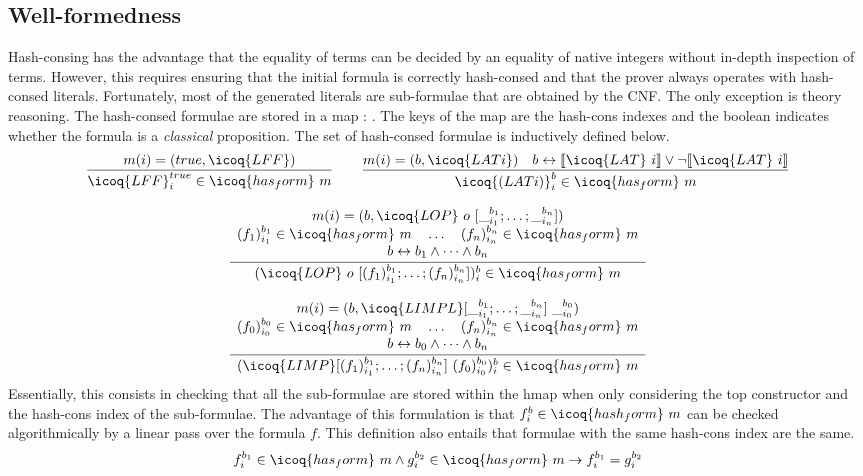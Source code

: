 \documentclass[utf8,a4paper,UKenglish,cleveref, autoref, thm-restate]{lipics-v2021}
\begin{document}
\subsection{Well-formedness}

Hash-consing has the advantage that the equality of terms can be
decided by an equality of native integers without in-depth inspection
of terms. However, this requires ensuring that the initial formula is
correctly hash-consed and that the prover always operates with
hash-consed literals. Fortunately, most of the generated literals are
sub-formulae that are obtained by the CNF. The only exception is
theory reasoning.
%
The hash-consed formulae are stored in a map  :
.  The keys of the map are the hash-cons indexes
and the boolean indicates whether the formula is a \emph{classical}
proposition. The set of hash-consed formulae  is
inductively defined below.
\[
  \begin{array}{c}
  \dfrac{m(i) = (true,\icoq{LFF})}
  {\icoq{LFF}_i^{true} \in \icoq{has_form}\ m }
  \qquad
  \dfrac{m(i) = (b,\icoq{LAT i}) \quad b \leftrightarrow \llbracket \icoq{LAT}\ i \rrbracket \lor \neg \llbracket \icoq{LAT}\ i \rrbracket }
  {\icoq{(LAT i)}_i^b \in \icoq{has_form}\ m }\\
    \\
    \dfrac{
    \begin{array}{c}
      m(i) = (b,\icoq{LOP}\ o\ [\__{i_1}^{b_1} ; \dots ; \__{i_n}^{b_n}]) \\
      (f_1)_{i_1}^{b_1} \in \icoq{has_form}\ m \quad \dots \quad (f_n)_{i_n}^{b_n} \in  \icoq{has_form}\ m\\
      b \leftrightarrow b_1 \land \dots \land b_n
    \end{array}}
    {(\icoq{LOP}\ o\  [(f_1)_{i_1}^{b_1}; \dots ; (f_n)_{i_n}^{b_n}])_i^b \in  \icoq{has_form}\ m
    }\\
    \\
    \dfrac{
    \begin{array}{c}
      m(i) = (b,\icoq{LIMPL} [\__{i_1}^{b_1} ; \dots ; \__{i_n}^{b_n}]\ \__{i_0}^{b_0}) \\
      (f_0)_{i_0}^{b_0} \in \icoq{has_form}\ m \quad \dots \quad (f_n)_{i_n}^{b_n} \in  \icoq{has_form}\ m\\
      b \leftrightarrow b_0 \land \dots \land b_n
    \end{array}}
    {(\icoq{LIMP} [(f_1)_{i_1}^{b_1}; \dots ; (f_n)_{i_n}^{b_n}]\ (f_0)_{i_0}^{b_0})_i^b \in  \icoq{has_form}\ m
    }
  \end{array}    
\]
Essentially, this consists in checking that all the sub-formulae are
stored within the hmap  when only considering the top
constructor and the hash-cons index of the sub-formulae.
%
The advantage of this formulation is that
$f_i^b \in \icoq{hash_form}\ m$ can be checked algorithmically by a
linear pass over the formula $f$.
%
This definition also entails that formulae with the same hash-cons index are the same.
\[
f_i^{b_1} \in \icoq{has_form}\ m \land g_i^{b_2} \in \icoq{has_form}\ m \to  f_i^{b_1} = g_i^{b_2}
\]
\end{document}
